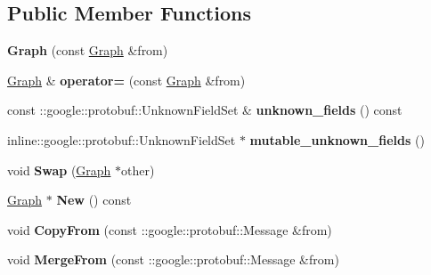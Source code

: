 \subsection*{Public Member Functions}
\begin{DoxyCompactItemize}
\item 
\hypertarget{classgraph_1_1Graph_a400fcc675124ef60cbc0d6ee0e25736c}{
{\bfseries Graph} (const \hyperlink{classgraph_1_1Graph}{Graph} \&from)}
\label{classgraph_1_1Graph_a400fcc675124ef60cbc0d6ee0e25736c}

\item 
\hypertarget{classgraph_1_1Graph_a2bb8b8cdf8632d9a9453b3f67d0eef9c}{
\hyperlink{classgraph_1_1Graph}{Graph} \& {\bfseries operator=} (const \hyperlink{classgraph_1_1Graph}{Graph} \&from)}
\label{classgraph_1_1Graph_a2bb8b8cdf8632d9a9453b3f67d0eef9c}

\item 
\hypertarget{classgraph_1_1Graph_a4944a9b85ffdbecf91ec2454f915b411}{
const ::google::protobuf::UnknownFieldSet \& {\bfseries unknown\_\-fields} () const }
\label{classgraph_1_1Graph_a4944a9b85ffdbecf91ec2454f915b411}

\item 
\hypertarget{classgraph_1_1Graph_a93081ad4e0af2767c6f57004f5f59dc2}{
inline::google::protobuf::UnknownFieldSet $\ast$ {\bfseries mutable\_\-unknown\_\-fields} ()}
\label{classgraph_1_1Graph_a93081ad4e0af2767c6f57004f5f59dc2}

\item 
\hypertarget{classgraph_1_1Graph_a8e3853558c7080802e9362e869206156}{
void {\bfseries Swap} (\hyperlink{classgraph_1_1Graph}{Graph} $\ast$other)}
\label{classgraph_1_1Graph_a8e3853558c7080802e9362e869206156}

\item 
\hypertarget{classgraph_1_1Graph_a812a4848569ca342a12b6b7a824b4118}{
\hyperlink{classgraph_1_1Graph}{Graph} $\ast$ {\bfseries New} () const }
\label{classgraph_1_1Graph_a812a4848569ca342a12b6b7a824b4118}

\item 
\hypertarget{classgraph_1_1Graph_ad8df9792d5748b48235e04e64abf84fd}{
void {\bfseries CopyFrom} (const ::google::protobuf::Message \&from)}
\label{classgraph_1_1Graph_ad8df9792d5748b48235e04e64abf84fd}

\item 
\hypertarget{classgraph_1_1Graph_ab52f15c185ebf734246297add1064b4a}{
void {\bfseries MergeFrom} (const ::google::protobuf::Message \&from)}
\label{classgraph_1_1Graph_ab52f15c185ebf734246297add1064b4a}


\end{DoxyCompactItemize}
